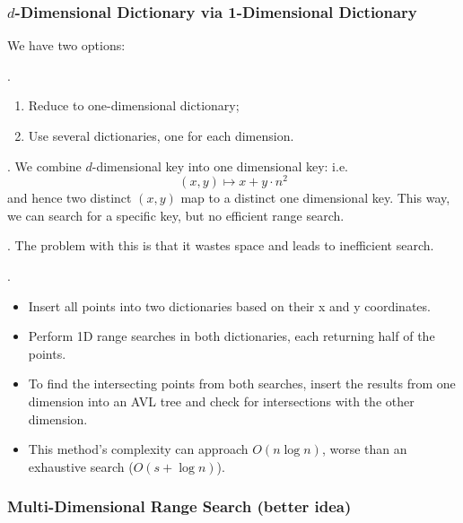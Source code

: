 \documentclass{article}
\begin{document}
\subsubsection{$d$-Dimensional Dictionary via 1-Dimensional Dictionary} 

We have two options: 

\begin{algo}[].
    \begin{enumerate}
        \item Reduce to one-dimensional dictionary; 
        \item Use several dictionaries, one for each dimension. 
    \end{enumerate}
\end{algo}

\begin{codes}.
    We combine $d$-dimensional key into one dimensional key: i.e. 
    \[ (x, y) \mapsto x + y \cdot n^2 \]
    and hence two distinct $(x, y)$ map to a distinct one dimensional key. This way, we can search for a specific key, but no efficient range search. 
\end{codes}

\begin{codes}.
    The problem with this is that it wastes space and leads to inefficient search. 
\end{codes}

\begin{examplee}.
    \begin{itemize}
        \item Insert all points into two dictionaries based on their x and y coordinates.
        \item Perform 1D range searches in both dictionaries, each returning half of the points.
        \item To find the intersecting points from both searches, insert the results from one dimension into an AVL tree and check for intersections with the other dimension.
        \item This method's complexity can approach $O(n \log n)$, worse than an exhaustive search ($O(s + \log n)$).
    \end{itemize}
\end{examplee}

\subsubsection{Multi-Dimensional Range Search (better idea)} 
\end{document}

